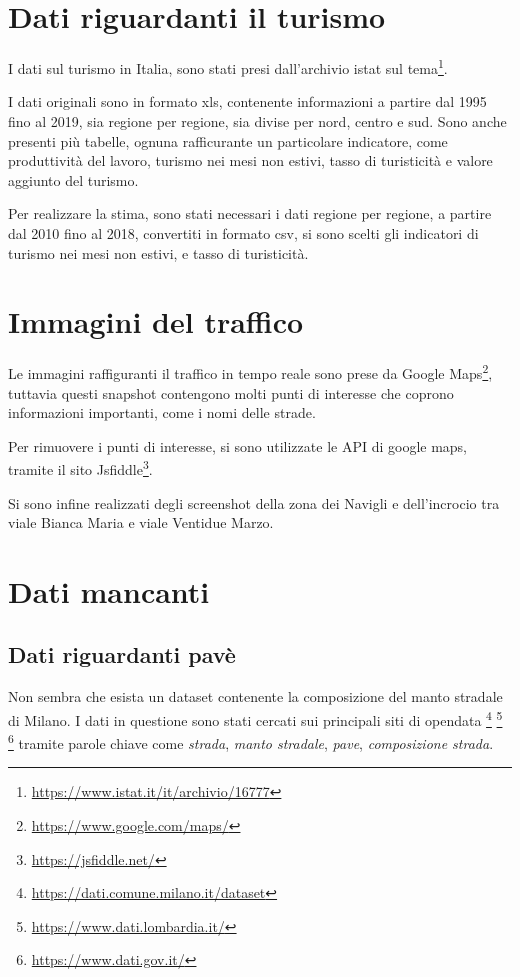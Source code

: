 \documentclass[a4paper]{report}
\newcommand{\quotestyle}[1]{\textit{#1}}
\begin{document}
\section{Dati riguardanti il turismo}

I dati sul turismo in Italia, sono stati presi dall'archivio istat sul 
tema\footnote{\url{https://www.istat.it/it/archivio/16777}}.

I dati originali sono in formato xls, contenente informazioni a partire dal 1995 
fino al 2019, sia regione per regione, sia divise per nord, centro e sud.
Sono anche presenti più tabelle, ognuna rafficurante un particolare indicatore, 
come produttività del lavoro, turismo nei mesi non estivi, tasso di turisticità 
e valore aggiunto del turismo.

Per realizzare la stima, sono stati necessari i dati regione per regione, 
a partire dal 2010 fino al 2018, convertiti in formato csv, si sono scelti gli indicatori di 
turismo nei mesi non estivi, e tasso di turisticità. 

\section{Immagini del traffico}

Le immagini raffiguranti il traffico in tempo reale sono prese da Google 
Maps\footnote{\url{https://www.google.com/maps/}}, 
tuttavia questi snapshot contengono molti punti di interesse che coprono informazioni importanti, 
come i nomi delle strade.

Per rimuovere i punti di interesse, si sono utilizzate le API di google maps, 
tramite il sito Jsfiddle\footnote{\url{https://jsfiddle.net/}}.

Si sono infine realizzati degli screenshot della zona dei Navigli e dell'incrocio tra viale 
Bianca Maria e viale Ventidue Marzo.

\section{Dati mancanti}

\subsection{Dati riguardanti pavè}
Non sembra che esista un dataset contenente la composizione del manto stradale di Milano.
I dati in questione sono stati cercati sui principali siti di opendata
\footnote{\url{https://dati.comune.milano.it/dataset}}
\footnote{\url{https://www.dati.lombardia.it/}}
\footnote{\url{https://www.dati.gov.it/}}
tramite parole chiave come \quotestyle{strada}, \quotestyle{manto stradale}, 
\quotestyle{pave}, \quotestyle{composizione strada}.
\end{document}
